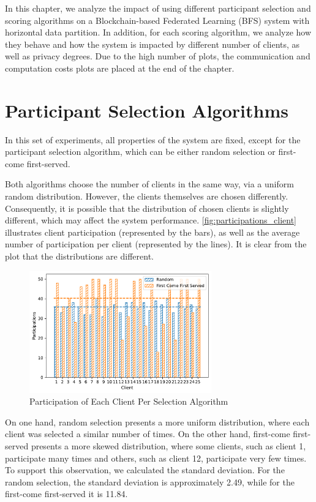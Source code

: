 In this chapter, we analyze the impact of using different participant selection and scoring algorithms on a Blockchain-based Federated Learning (BFS) system with horizontal data partition. In addition, for each scoring algorithm, we analyze how they behave and how the system is impacted by different number of clients, as well as privacy degrees. Due to the high number of plots, the communication and computation costs plots are placed at the end of the chapter.

\section{Participant Selection Algorithms}

In this set of experiments, all properties of the system are fixed, except for the participant selection algorithm, which can be either random selection or first-come first-served.

Both algorithms choose the number of clients in the same way, via a uniform random distribution. However, the clients themselves are chosen differently. Consequently, it is possible that the distribution of chosen clients is slightly different, which may affect the system performance. \autoref{fig:participations_client} illustrates client participation (represented by the bars), as well as the average number of participation per client (represented by the lines). It is clear from the plot that the distributions are different.

\begin{figure}[!ht]
    \centering
    \centering
    \includegraphics[width=0.7\textwidth]{graphics/selection/clients.pdf}
    \caption{Participation of Each Client Per Selection Algorithm}
    \label{fig:participations_client}
\end{figure}

On one hand, random selection presents a more uniform distribution, where each client was selected a similar number of times. On the other hand, first-come first-served presents a more skewed distribution, where some clients, such as client 1, participate many times and others, such as client 12, participate very few times. To support this observation, we calculated the standard deviation. For the random selection, the standard deviation is approximately 2.49, while for the first-come first-served it is 11.84.

